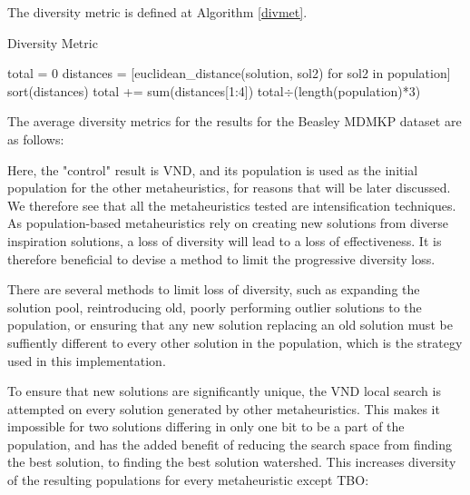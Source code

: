 \documentclass[11pt, letterpaper, onecolumn]{article}
\begin{document}
The diversity metric is defined at Algorithm \ref{divmet}. 



\begin{algorithm}
\caption{Diversity Metric}
\label{divmet}
\begin{algorithmic}
\STATE total = 0
\STATE distances = [euclidean\_distance(solution, sol2) for sol2 in population]
\STATE sort(distances)
\STATE total += sum(distances[1:4])
\ENDFOR
\RETURN total$\div$(length(population)*3)
\end{algorithmic}
\end{algorithm}

\clearpage
The average diversity metrics for the results for the Beasley MDMKP dataset are as follows:


\begin{table}[htbp]
\end{table}

Here, the "control" result is VND, and its population is used as the initial population for the other metaheuristics, for reasons that will be later discussed. We therefore see that all the metaheuristics tested are intensification techniques. As population-based metaheuristics rely on creating new solutions from diverse inspiration solutions, a loss of diversity will lead to a loss of effectiveness. It is therefore beneficial to devise a method to limit the progressive diversity loss. 

There are several methods to limit loss of diversity, such as expanding the solution pool, reintroducing old, poorly performing outlier solutions to the population, or ensuring that any new solution replacing an old solution must be suffiently different to every other solution in the population, which is the strategy used in this implementation. 

To ensure that new solutions are significantly unique, the VND local search is attempted on every solution generated by other metaheuristics. This makes it impossible for two solutions differing in only one bit to be a part of the population, and has the added benefit of reducing the search space from finding the best solution, to finding the best solution watershed. This increases diversity of the resulting populations for every metaheuristic except TBO:
\end{document}
